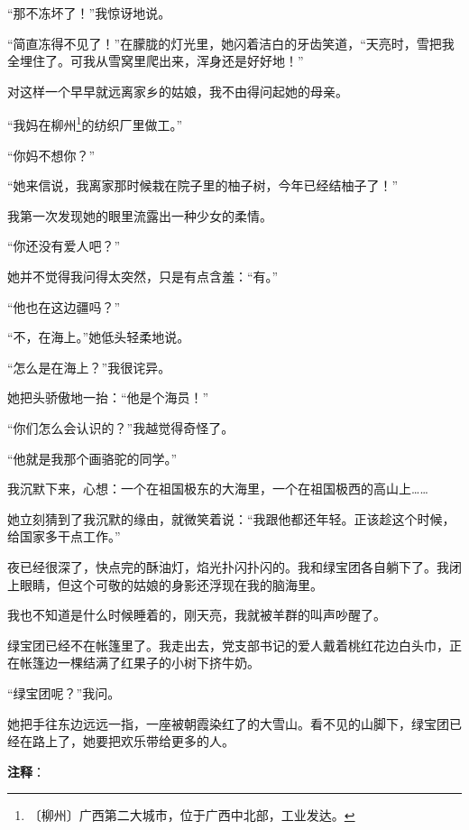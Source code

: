 \documentclass[12pt,UTF-8,openany]{ctexbook}
\begin{document}
\begin{large}
    “那不冻坏了！”我惊讶地说。
    
    “简直冻得不见了！”在朦胧的灯光里，她闪着洁白的牙齿笑道，“天亮时，雪把我全埋住了。可我从雪窝里爬出来，浑身还是好好地！”
    
    对这样一个早早就远离家乡的姑娘，我不由得问起她的母亲。
    
    “我妈在柳州\footnote{〔柳州〕广西第二大城市，位于广西中北部，工业发达。}的纺织厂里做工。”
    
    “你妈不想你？”
    
    “她来信说，我离家那时候栽在院子里的柚子树，今年已经结柚子了！”
    
    我第一次发现她的眼里流露出一种少女的柔情。
    
    “你还没有爱人吧？”
    
    她并不觉得我问得太突然，只是有点含羞：“有。”
    
    “他也在这边疆吗？”
    
    “不，在海上。”她低头轻柔地说。
    
    “怎么是在海上？”我很诧异。
    
    她把头骄傲地一抬：“他是个海员！”
    
    “你们怎么会认识的？”我越觉得奇怪了。
    
    “他就是我那个画骆驼的同学。”
    
    我沉默下来，心想：一个在祖国极东的大海里，一个在祖国极西的高山上……
    
    她立刻猜到了我沉默的缘由，就微笑着说：“我跟他都还年轻。正该趁这个时候，给国家多干点工作。”
    
    夜已经很深了，快点完的酥油灯，焰光扑闪扑闪的。我和绿宝团各自躺下了。我闭上眼睛，但这个可敬的姑娘的身影还浮现在我的脑海里。
    
    我也不知道是什么时候睡着的，刚天亮，我就被羊群的叫声吵醒了。
    
    绿宝团已经不在帐篷里了。我走出去，党支部书记的爱人戴着桃红花边白头巾，正在帐篷边一棵结满了红果子的小树下挤牛奶。
    
    “绿宝团呢？”我问。
    
    她把手往东边远远一指，一座被朝霞染红了的大雪山。看不见的山脚下，绿宝团已经在路上了，她要把欢乐带给更多的人。
    
\end{large}


\newpage

\textbf{注释}：

\vspace{-1em}
\end{document}
